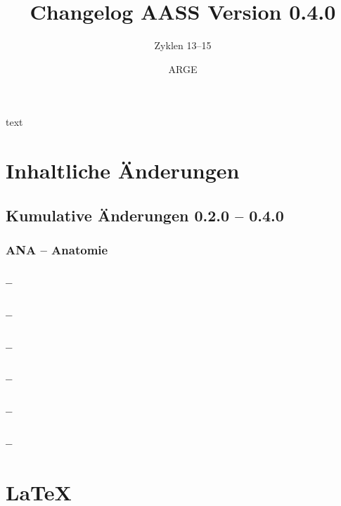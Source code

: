 \documentclass[ngerman,a4paper,fontsize=9pt,BCOR=0cm,DIV=11,headings=big,draft=no]{scrreprt}
\author{ARGE \AASS}
\title{Changelog AASS Version 0.4.0}
\subtitle{Zyklen 13--15}
\begin{document}
\maketitle

\tableofcontents

text

\chapter{Inhaltliche Änderungen}

\section{Kumulative Änderungen 0.2.0 -- 0.4.0}


\subsection{ANA -- Anatomie}

\subsection{ -- }

\subsection{ -- }

\subsection{ -- }

\subsection{ -- }

\subsection{ -- }

\subsection{ -- }

\chapter{\LaTeX{}}
\end{document}
